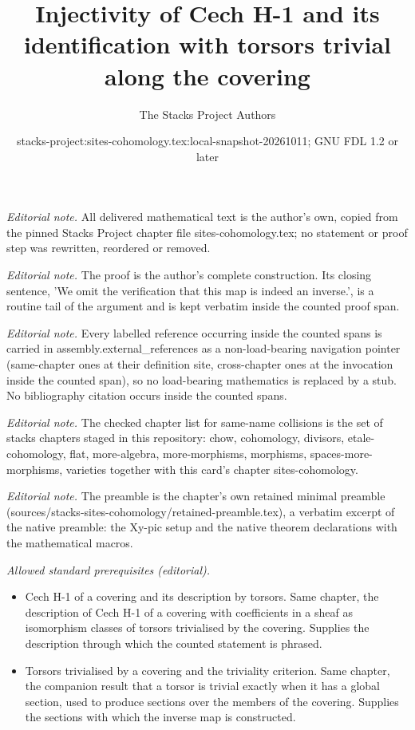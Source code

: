 \documentclass[10pt,a4paper]{amsart}
\title{Injectivity of Cech H-1 and its identification with torsors trivial along the covering}
\author{The Stacks Project Authors}
\date{stacks-project:sites-cohomology.tex:local-snapshot-20261011; GNU FDL 1.2 or later}
\theoremstyle{plain}
\theoremstyle{definition}
\theoremstyle{remark}
\numberwithin{equation}{subsection}
\begin{document}
\maketitle
\noindent\textit{Editorial note.} All delivered mathematical text is the author's own, copied from the pinned Stacks Project chapter file sites-cohomology.tex; no statement or proof step was rewritten, reordered or removed.\par\medskip
\noindent\textit{Editorial note.} The proof is the author's complete construction. Its closing sentence, 'We omit the verification that this map is indeed an inverse.', is a routine tail of the argument and is kept verbatim inside the counted proof span.\par\medskip
\noindent\textit{Editorial note.} Every labelled reference occurring inside the counted spans is carried in assembly.external\_references as a non-load-bearing navigation pointer (same-chapter ones at their definition site, cross-chapter ones at the invocation inside the counted span), so no load-bearing mathematics is replaced by a stub. No bibliography citation occurs inside the counted spans.\par\medskip
\noindent\textit{Editorial note.} The checked chapter list for same-name collisions is the set of stacks chapters staged in this repository: chow, cohomology, divisors, etale-cohomology, flat, more-algebra, more-morphisms, morphisms, spaces-more-morphisms, varieties together with this card's chapter sites-cohomology.\par\medskip
\noindent\textit{Editorial note.} The preamble is the chapter's own retained minimal preamble (sources/stacks-sites-cohomology/retained-preamble.tex), a verbatim excerpt of the native preamble: the Xy-pic setup and the native theorem declarations with the mathematical macros.\par\medskip
\noindent\textit{Allowed standard prerequisites (editorial).}\begin{itemize}
\item Cech H-1 of a covering and its description by torsors. Same chapter, the description of Cech H-1 of a covering with coefficients in a sheaf as isomorphism classes of torsors trivialised by the covering. Supplies the description through which the counted statement is phrased.
\item Torsors trivialised by a covering and the triviality criterion. Same chapter, the companion result that a torsor is trivial exactly when it has a global section, used to produce sections over the members of the covering. Supplies the sections with which the inverse map is constructed.
\end{itemize}\medskip
\end{document}
